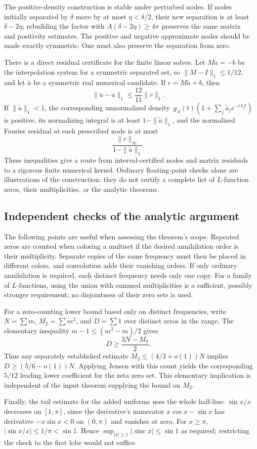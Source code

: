 The positive-density construction is stable under perturbed nodes.  If
nodes initially separated by $\delta$ move by at most $\eta<\delta/2$,
their new separation is at least $\delta-2\eta$; rebuilding the factor with
$A(\delta-2\eta)\ge4\pi$ preserves the same matrix and positivity
estimates.  The positive and negative approximate nodes should be made
exactly symmetric.  One must also preserve the separation from zero.

There is a direct residual certificate for the finite linear solves.  Let
$M a=-b$ be the interpolation system for a symmetric separated set, so
$\|M-I\|_1\le1/12$, and let $\widetilde a$ be a symmetric real numerical
candidate.  If $r=M\widetilde a+b$, then
\[
 \|\widetilde a-a\|_1\le\frac{12}{11}\|r\|_1.
\]
If $\|\widetilde a\|_1<1$, the corresponding unnormalized density
$\,g_A(t)(1+\sum_j\widetilde a_j e^{-i\lambda_jt})$ is positive, its
normalizing integral is at least $1-\|\widetilde a\|_1$, and the
normalized Fourier residual at each prescribed node is at most
\[
 \frac{\|r\|_\infty}{1-\|\widetilde a\|_1}.
\]
These inequalities give a route from interval-certified nodes and matrix
residuals to a rigorous finite numerical kernel.  Ordinary floating-point
checks alone are illustrations of the construction: they do not certify a
complete list of $L$-function zeros, their multiplicities, or the analytic
theorems.

\subsection{Independent checks of the analytic argument}

The following points are useful when assessing the theorem's scope.
Repeated zeros are counted when coloring a multiset if the desired
annihilation order is their multiplicity.  Separate copies of the same
frequency must then be placed in different colors, and convolution adds
their vanishing orders.  If only ordinary annihilation is required, each
distinct frequency needs only one copy.  For a family of $L$-functions,
using the union with summed multiplicities is a sufficient, possibly
stronger requirement; no disjointness of their zero sets is used.

For a zero-counting lower bound based only on distinct frequencies, write
$N=\sum m$, $M_2=\sum m^2$, and $D=\sum1$ over distinct zeros in the
range.  The elementary inequality
$m-1\le(m^2-m)/2$ gives
\[
 D\ge\frac{3N-M_2}{2}.
\]
Thus any separately established estimate
$M_2\le(4/3+o(1))N$ implies $D\ge(5/6-o(1))N$.  Applying Jensen with
this count yields the corresponding $5/12$ leading lower coefficient for
the zeta zero set.  This elementary implication is independent of the
input theorem supplying the bound on $M_2$.

Finally, the tail estimate for the added uniforms uses the whole half-line:
$\sin x/x$ decreases on $[1,\pi]$, since the derivative's numerator
$x\cos x-\sin x$ has derivative $-x\sin x<0$ on $(0,\pi)$ and vanishes
at zero.  For $x\ge\pi$, $|\sin x/x|\le1/\pi<\sin1$.  Hence
$\sup_{|x|\ge1}|\operatorname{sinc}x|\le\sin1$ as required; restricting
the check to the first lobe would not suffice.

